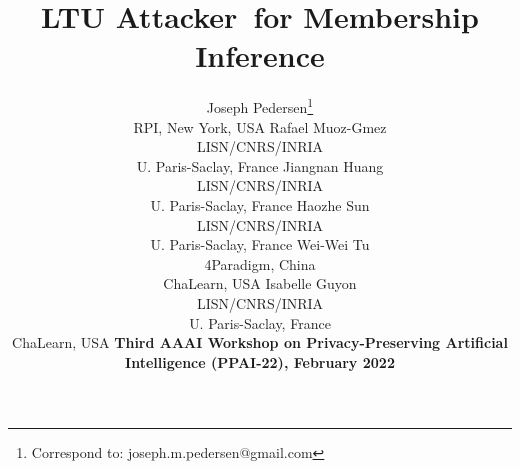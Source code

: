 \documentclass[letterpaper]{article}
\newcommand{\oracle}{LTU Attacker~}
\begin{document}
\renewcommand*{\thefootnote}{\fnsymbol{footnote}}
\title{\oracle for Membership Inference}
\author{Joseph Pedersen\thanks{Correspond to:  joseph.m.pedersen@gmail.com} \\ RPI, New York, USA
\And
Rafael Muoz-Gmez \\ LISN/CNRS/INRIA \\ U. Paris-Saclay, France
\And
Jiangnan Huang \\ LISN/CNRS/INRIA \\ U. Paris-Saclay, France
\AND
Haozhe Sun \\ LISN/CNRS/INRIA \\ U. Paris-Saclay, France
\And
Wei-Wei Tu \\ 4Paradigm, China \\ ChaLearn, USA
\And
Isabelle Guyon \\ LISN/CNRS/INRIA \\ U. Paris-Saclay, France \\ ChaLearn, USA
\AND
{\bf Third AAAI Workshop on Privacy-Preserving Artificial Intelligence (PPAI-22), February 2022}\\
}
\maketitle
%
\renewcommand*{\thefootnote}{\arabic{footnote}}
\setcounter{footnote}{0}


\end{document}
